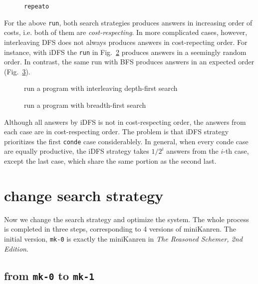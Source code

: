 \documentclass[format=acmlarge, review=true, authordraft=true]{acmart}
\begin{document}
\begin{figure}
  
  
  \caption{\texttt{repeato}}
  \label{def-repeato}
\end{figure}


For the above \texttt{run}, both search strategies produces answers in increasing order of costs, i.e. both of them are \emph{cost-respecting}. In more complicated cases, however, interleaving DFS does not always produces answers in cost-repecting order. For instance, with iDFS the \texttt{run} in Fig.~\ref{conde-repeato-iDFS} produces answers in a seemingly random order. In contrast, the same run with BFS produces answers in an expected order (Fig.~\ref{conde-repeato-BFS}).

\begin{figure}
	
	\caption{run a program with interleaving depth-first search}
	\label{conde-repeato-iDFS}
\end{figure}

\begin{figure}
	
	\caption{run a program with breadth-first search}
	\label{conde-repeato-BFS}
\end{figure}

Although all answers by iDFS is not in cost-respecting order, the answers from each case are in cost-respecting order. The problem is that iDFS strategy prioritizes the first \texttt{conde} case considerablely. In general, when every conde case are equally productive, the iDFS strategy takes $1/2^{i}$ answers from the $i$-th case, except the last case, which share the same portion as the second last.




\section{change search strategy}

Now we change the search strategy and optimize the system. The whole process is completed in three steps, corresponding to 4 versions of miniKanren. The initial version, \texttt{mk-0} is exactly the miniKanren in \emph{The Reasoned Schemer, 2nd Edition}.

\subsection{from \texttt{mk-0} to \texttt{mk-1}}
\end{document}
